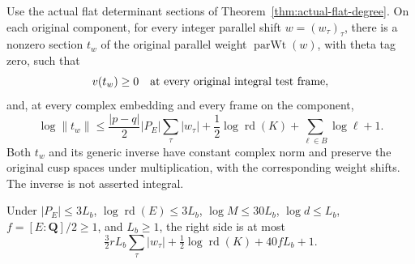 \begin{theorem}\label{thm:actual-short-parallel-twist}
Use the actual flat determinant sections of
Theorem~\ref{thm:actual-flat-degree}.  On each original component,
for every integer parallel shift $w=(w_\tau)_\tau$, there is a
nonzero section $t_w$ of the original parallel weight
$\operatorname{parWt}(w)$, with theta tag zero, such that
\[
 v(t_w)\ge0\quad\hbox{at every original integral test frame},
\]
and, at every complex embedding and every frame on the component,
\begin{equation}\label{eq:actual-parallel-twist-bound}
 \log\|t_w\|\le
 \frac{|p-q|}{2}|P_E|\sum_\tau|w_\tau|
       +\frac12\log\operatorname{rd}(K)
       +\sum_{\ell\in B}\log\ell+1.
\end{equation}
Both $t_w$ and its generic inverse have constant complex norm and
preserve the original cusp spaces under multiplication, with the
corresponding weight shifts.  The inverse is not asserted integral.

Under $|P_E|\le3L_b$, $\log\operatorname{rd}(E)\le3L_b$,
$\log M\le30L_b$, $\log d\le L_b$, $f=[E:\mathbf Q]/2\ge1$,
and $L_b\ge1$, the right side is at most
\[
       \tfrac32 rL_b\sum_\tau|w_\tau|
                  +\tfrac12\log\operatorname{rd}(K)+40fL_b+1.
\]
\end{theorem}

